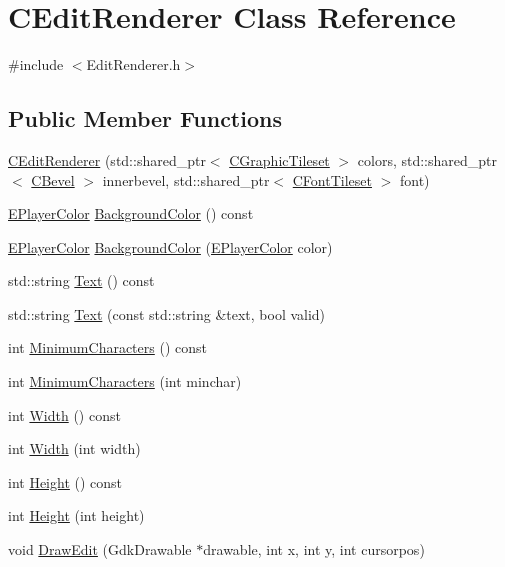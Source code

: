 \hypertarget{classCEditRenderer}{}\section{C\+Edit\+Renderer Class Reference}
\label{classCEditRenderer}


{\ttfamily \#include $<$Edit\+Renderer.\+h$>$}

\subsection*{Public Member Functions}
\begin{DoxyCompactItemize}
\item 
\hyperlink{classCEditRenderer_a672139544dacbe5fb75dd30663a0bc0b}{C\+Edit\+Renderer} (std\+::shared\+\_\+ptr$<$ \hyperlink{classCGraphicTileset}{C\+Graphic\+Tileset} $>$ colors, std\+::shared\+\_\+ptr$<$ \hyperlink{classCBevel}{C\+Bevel} $>$ innerbevel, std\+::shared\+\_\+ptr$<$ \hyperlink{classCFontTileset}{C\+Font\+Tileset} $>$ font)
\item 
\hyperlink{GameDataTypes_8h_aafb0ca75933357ff28a6d7efbdd7602f}{E\+Player\+Color} \hyperlink{classCEditRenderer_a531e5a92494375020328936efdf239d1}{Background\+Color} () const
\item 
\hyperlink{GameDataTypes_8h_aafb0ca75933357ff28a6d7efbdd7602f}{E\+Player\+Color} \hyperlink{classCEditRenderer_afc5aed55b1384142fbd096c7ffe2476f}{Background\+Color} (\hyperlink{GameDataTypes_8h_aafb0ca75933357ff28a6d7efbdd7602f}{E\+Player\+Color} color)
\item 
std\+::string \hyperlink{classCEditRenderer_adcb8ea0811710a16181f4caa4c5bb075}{Text} () const
\item 
std\+::string \hyperlink{classCEditRenderer_aaf22d741a35786d3b667eca90c25d1f4}{Text} (const std\+::string \&text, bool valid)
\item 
int \hyperlink{classCEditRenderer_a36726cc31fedec0820076c03186158e7}{Minimum\+Characters} () const
\item 
int \hyperlink{classCEditRenderer_a0ed256b9ca7726b2f7de88b4682ed595}{Minimum\+Characters} (int minchar)
\item 
int \hyperlink{classCEditRenderer_a9d93896dd7d4a279e8a957627679a511}{Width} () const
\item 
int \hyperlink{classCEditRenderer_a9b9e7e4fa7e7c2ef8c8b4bd09c4122ac}{Width} (int width)
\item 
int \hyperlink{classCEditRenderer_ad5ad32a8ae2372e21bb9365a6b6d0f59}{Height} () const
\item 
int \hyperlink{classCEditRenderer_ab3c2442f35049d3fa57a173e68043bfa}{Height} (int height)
\item 
void \hyperlink{classCEditRenderer_a3b043cca5f931cdbbfff35d07100be5e}{Draw\+Edit} (Gdk\+Drawable $\ast$drawable, int x, int y, int cursorpos)
\end{DoxyCompactItemize}
